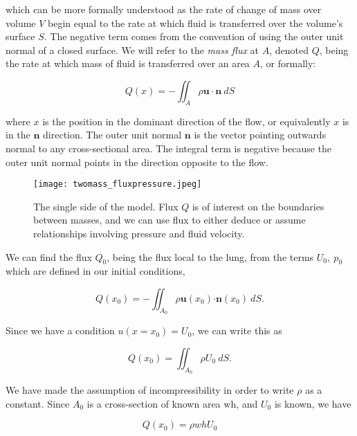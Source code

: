 \documentclass{article}
\begin{document}
which can be more formally understood as the rate of change of mass over volume $V$ begin equal to the rate at which fluid is transferred over the volume's surface $S$. 
The negative term comes from the convention of using the outer unit normal of a closed surface.
We will refer to the \textit{mass flux} at $A$, denoted $Q$, being the rate at which mass of fluid is transferred over an area $A$, or formally:

\begin{equation}
    Q(x) = -\iint_A \rho \bm{u \cdot n}~dS
\end{equation}

where $x$ is the position in the dominant direction of the flow, or equivalently $x$ is in the $\mathbf{n}$ direction.
The outer unit normal $\mathbf{n}$ is the vector pointing outwards normal to any cross-sectional area. 
The integral term is negative because the outer unit normal points in the direction opposite to the flow.

\begin{figure}
    \centering
    \texttt{[image: twomass\_fluxpressure.jpeg]}
    \caption{The single side of the model.
    Flux $Q$ is of interest on the boundaries between masses,
    and we can use flux to either deduce or assume relationships involving pressure and fluid velocity.
    }
    \label{fig:twomass_fluxpressure}
\end{figure}

We can find the flux $Q_0$, being the flux local to the lung, from the terms $U_0,~p_0$ which are defined in our initial conditions,

\begin{equation}
    Q(x_0) = -\iint_{A_0} \rho \bm{u}(x_0)\bm{\cdot n}(x_0)~dS.
\end{equation}

Since we have a condition $u(x=x_0) = U_0$, we can write this as

\begin{equation}
    Q(x_0) = \iint_{A_0} \rho U_0~dS.
\end{equation}

We have made the assumption of incompressibility in order to write $\rho$ as a constant.
Since $A_0$ is a cross-section of known area $\mathrm{wh}$, and $U_0$ is known, we have

\begin{equation}
    Q(x_0) = \rho wh U_0
    \label{eqn:twomass_lung_flux}
\end{equation}
\end{document}
